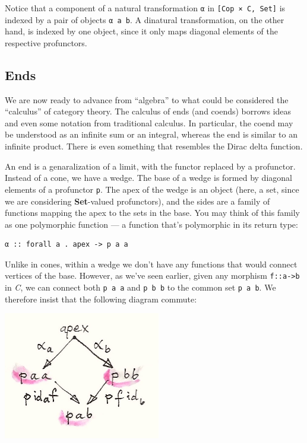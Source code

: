 Notice that a component of a natural transformation \texttt{α} in
\texttt{{[}Cop\ ×\ C,\ Set{]}} is indexed by a pair of objects
\texttt{α\ a\ b}. A dinatural transformation, on the other hand, is
indexed by one object, since it only maps diagonal elements of the
respective profunctors.

\subsection{Ends}\label{ends}

We are now ready to advance from ``algebra'' to what could be considered
the ``calculus'' of category theory. The calculus of ends (and coends)
borrows ideas and even some notation from traditional calculus. In
particular, the coend may be understood as an infinite sum or an
integral, whereas the end is similar to an infinite product. There is
even something that resembles the Dirac delta function.

An end is a genaralization of a limit, with the functor replaced by a
profunctor. Instead of a cone, we have a wedge. The base of a wedge is
formed by diagonal elements of a profunctor \texttt{p}. The apex of the
wedge is an object (here, a set, since we are considering
\textbf{Set}-valued profunctors), and the sides are a family of
functions mapping the apex to the sets in the base. You may think of
this family as one polymorphic function --- a function that's
polymorphic in its return type:

\begin{verbatim}
α :: forall a . apex -> p a a
\end{verbatim}

Unlike in cones, within a wedge we don't have any functions that would
connect vertices of the base. However, as we've seen earlier, given any
morphism \texttt{f::a-\textgreater{}b} in \emph{C}, we can connect both
\texttt{p\ a\ a} and \texttt{p\ b\ b} to the common set
\texttt{p\ a\ b}. We therefore insist that the following diagram
commute:

\includegraphics[width=2.69792in]{images/end-2.jpg}

